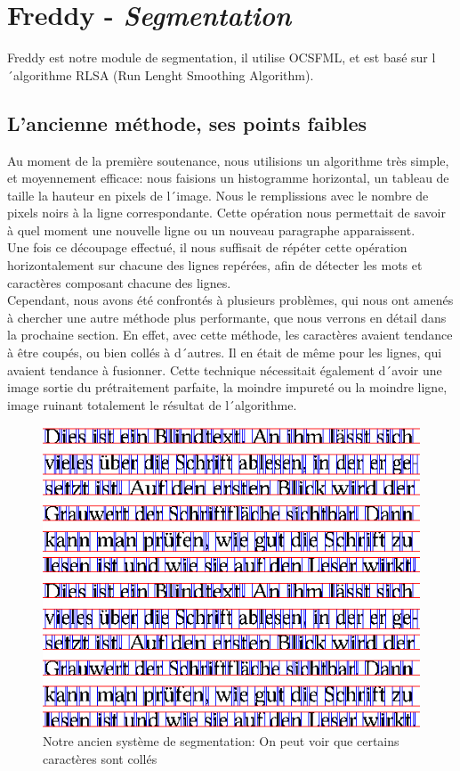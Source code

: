 \chapter{Freddy - \emph{Segmentation}}

Freddy est notre module de segmentation, il utilise OCSFML, et est basé sur l´algorithme RLSA (Run Lenght Smoothing Algorithm).

\section{L'ancienne méthode, ses points faibles}

Au moment de la première soutenance, nous utilisions un algorithme très simple, et moyennement efficace: nous faisions un histogramme horizontal, un tableau de taille la hauteur en pixels de l´image. Nous le remplissions avec le nombre de pixels noirs à la ligne correspondante. Cette opération nous permettait de savoir à quel moment une nouvelle ligne ou un nouveau paragraphe apparaissent.\\
Une fois ce découpage effectué, il nous suffisait de répéter cette opération horizontalement sur chacune des lignes repérées, afin de détecter les mots et caractères composant chacune des lignes.\\
Cependant, nous avons été confrontés à plusieurs problèmes, qui nous ont amenés à chercher une autre méthode plus performante, que nous verrons en détail dans la prochaine section. En effet, avec cette méthode, les caractères avaient tendance à être coupés, ou bien collés à d´autres. Il en était de même pour les lignes, qui avaient tendance à fusionner. Cette technique nécessitait également d´avoir une image sortie du prétraitement parfaite, la moindre impureté ou la moindre ligne, image ruinant totalement le résultat de l´algorithme.

\begin{figure}[h!]
  \centering
  \includegraphics[scale=0.8]{chapters/Pictures/segmented.png}
  \caption{Notre ancien système de segmentation: On peut voir que certains caractères sont collés}
\end{figure}



